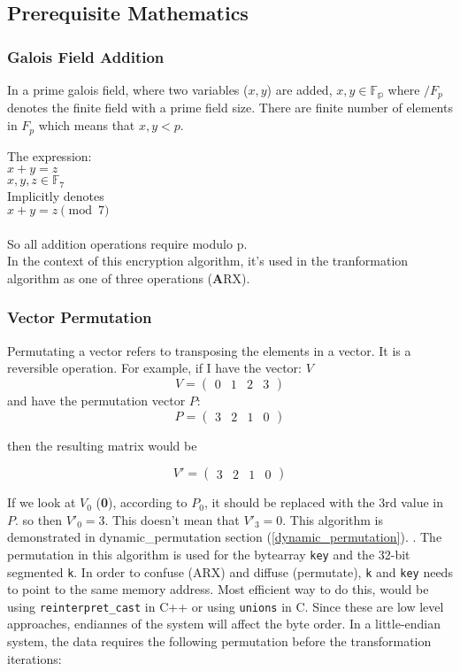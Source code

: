 \documentclass[fleqn, a4paper,12pt]{article}
\begin{document}
\subsection{Prerequisite Mathematics}

\subsubsection{Galois Field Addition}

In a prime galois field, where two variables ($x,y$) are added, $x,y \in \mathbb{F_p}$ where $\mathbb/{F_p}$ denotes the finite field with a prime field size. There are finite number of elements in $F_p$ which means that $x,y < p$. 

The expression:\\
$x + y = z$\\
$x,y,z \in \mathbb{F}_7$\\

Implicitly denotes \\
$x + y = z \pmod 7$\\
\\
So all addition operations require modulo p.\\
In the context of this encryption algorithm, it's used in the tranformation algorithm as one of three operations (\textbf{A}RX). 

\subsubsection{Vector Permutation}

Permutating a vector refers to transposing the elements in a vector. It is a reversible operation.
For example, if I have the vector: $V$ \\
\[
V = 
\begin{pmatrix}
	0 & 1 & 2 & 3
\end{pmatrix}
\]
and have the permutation vector $P$: \\

\[
P = 
\begin{pmatrix}
	3 & 2 & 1 & 0
\end{pmatrix}
\]

then the resulting matrix would be 

\[
V' = 
\begin{pmatrix}
	3 & 2 & 1 & 0
\end{pmatrix}
\]

If we look at $V_0$ (\textbf{0}),  according to $P_0$, it should be replaced with the 3rd value in $P$. so then $V'_0 = 3$. This doesn't mean that $V'_3 = 0$. This algorithm is demonstrated in dynamic\_permutation section (\ref{dynamic_permutation}).
. The permutation in this algorithm is used for the bytearray \texttt{key} and the 32-bit segmented \texttt{k}. In order to confuse (ARX) and diffuse (permutate), \texttt{k} and \texttt{key} needs to point to the same memory address. Most efficient way to do this, would be using \texttt{reinterpret\_cast} in C++ or using \texttt{unions} in C. Since these are low level approaches, endiannes of the system will affect the byte order. In a little-endian system, the data requires the following permutation before the transformation iterations:
\end{document}
